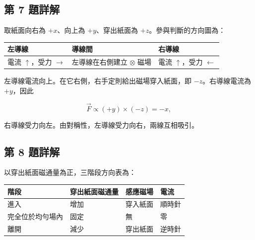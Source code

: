\documentclass[11pt,a4paper]{article}
\newcounter{none}
\begin{document}
\subsection{第 7 題詳解}\label{ux7b2c-7-ux984cux8a73ux89e3}

取紙面向右為 \(+x\)、向上為 \(+y\)、穿出紙面為 \(+z\)。參與判斷的方向圖為：

{\def\LTcaptype{none} %
\begin{longtable}[]{@{}
  >{\raggedright\arraybackslash}p{}
  >{\raggedright\arraybackslash}p{}
  >{\raggedright\arraybackslash}p{}@{}}
\toprule\noalign{}
\begin{minipage}[b]{\linewidth}\raggedright
左導線
\end{minipage} & \begin{minipage}[b]{\linewidth}\raggedright
導線間
\end{minipage} & \begin{minipage}[b]{\linewidth}\raggedright
右導線
\end{minipage} \\
\midrule\noalign{}
\endhead
\bottomrule\noalign{}
\endlastfoot
電流 \(\uparrow\)，受力 \(\rightarrow\) & 左導線在右側建立 \(\otimes\) 磁場 & 電流 \(\uparrow\)，受力 \(\leftarrow\) \\
\end{longtable}
}

左導線電流向上。在它右側，右手定則給出磁場穿入紙面，即 \(-z\)。右導線電流為 \(+y\)，因此

\[
\vec F\propto(+y)\times(-z)=-x,
\]

右導線受力向左。由對稱性，左導線受力向右，兩線互相吸引。

\subsection{第 8 題詳解}\label{ux7b2c-8-ux984cux8a73ux89e3}

以穿出紙面磁通量為正，三階段方向表為：

{\def\LTcaptype{none} %
\begin{longtable}[]{@{}llll@{}}
\toprule\noalign{}
階段 & 穿出紙面磁通量 & 感應磁場 & 電流 \\
\midrule\noalign{}
\endhead
\bottomrule\noalign{}
\endlastfoot
進入 & 增加 & 穿入紙面 & 順時針 \\
完全位於均勻場內 & 固定 & 無 & 零 \\
離開 & 減少 & 穿出紙面 & 逆時針 \\
\end{longtable}
}
\end{document}
